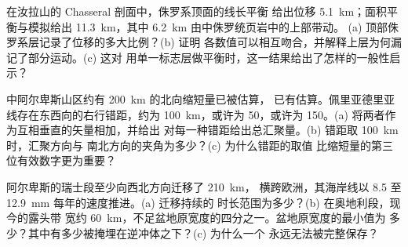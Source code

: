 \begin{exercise}[$\star\star\star$]\label{exo:b2:alpine-orogen:10}
在汝拉山的 Chasseral 剖面中，侏罗系顶面的线长平衡
给出位移 \qty{5.1}{km}；面积平衡与模拟给出 \qty{11.3}{km}，其中
\qty{6.2}{km} 由中侏罗统页岩中的上部带动。
(a) 顶部侏罗系层记录了位移的多大比例？(b) 证明
各数值可以相互吻合，并解释上层为何漏记了部分运动。(c) 这对
用单一标志层做平衡时，这一结果给出了怎样的一般性启示？
\end{exercise}

\begin{exercise}[$\star\star\star$]\label{exo:b2:alpine-orogen:11}
中阿尔卑斯山区约有 \qty{200}{km} 的北向缩短量已被估算，
已有估算。佩里亚德里亚线存在东西向的右行错距，约为
\qty{100}{km}，或许为 50，或许为 150。(a) 将两者作为互相垂直的矢量相加，并给出
对每一种错距给出总汇聚量。(b) 错距取 \qty{100}{km} 时，汇聚方向与
南北方向的夹角为多少？(c) 为什么错距的取值
比缩短量的第三位有效数字更为重要？
\end{exercise}

\begin{exercise}[$\star\star\star$]\label{exo:b2:alpine-orogen:12}
阿尔卑斯的瑞士段至少向西北方向迁移了 \qty{210}{km}，
横跨欧洲，其海岸线以 8.5 至 \qty{12.9}{mm} 每年的速度推进。(a) 迁移持续的
时长范围为多少？(b) 在奥地利段，现今的露头带
宽约 \qty{60}{km}，不足盆地原宽度的四分之一。盆地原宽度的最小值为
多少？其中有多少被掩埋在逆冲体之下？(c) 为什么一个
永远无法被完整保存？
\end{exercise}

